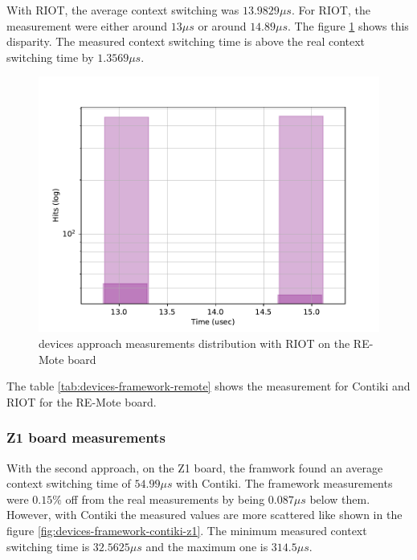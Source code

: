 With RIOT, the average context switching was $13.9829\mu s$.
For RIOT, the measurement were either around $13 \mu s$ or around $14.89 \mu s$.
The figure \ref{fig:devices-framework-riot-remote} shows this disparity.
The measured context switching time is above the real context switching time by $1.3569\mu s$.

\begin{figure}[!ht]
      \centering
      \includegraphics[scale=.7]{assets/devices-framework-riot-remote.pdf}
      \caption{devices approach measurements distribution with RIOT on the RE-Mote board\label{fig:devices-framework-riot-remote}}
\end{figure}

The table \ref{tab:devices-framework-remote} shows the measurement for Contiki and RIOT for the RE-Mote board.



\subsubsection{Z1 board measurements}
With the second approach, on the Z1 board, the framwork found an average context switching time of $54.99\mu s$ with Contiki.
The framework measurements were $0.15\%$ off from the real measurements by being $0.087\mu s$ below them.
However, with Contiki the measured values are more scattered like shown in the figure \ref{fig:devices-framework-contiki-z1}.
The minimum measured context switching time is $32.5625\mu s$ and the maximum one is $314.5\mu s$.

